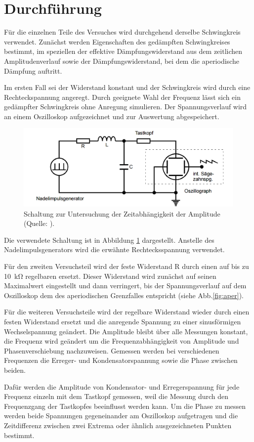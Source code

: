 \section{Durchführung}
\label{sec:Durchführung}
Für die einzelnen Teile des Versuches wird durchgehend derselbe Schwingkreis
verwendet. Zunächst werden Eigenschaften des gedämpften Schwingkreises bestimmt,
im speziellen der effektive
Dämpfungswiderstand aus dem zeitlichen Amplitudenverlauf
sowie der Dämpfungswiderstand, bei dem die aperiodische
Dämpfung auftritt.

Im ersten Fall sei der Widerstand konstant und der Schwingkreis wird durch eine
Rechteckspannung angeregt. Durch geeignete Wahl der Frequenz lässt sich ein
gedämpfter Schwingkreis ohne Anregung simulieren. Der Spannungsverlauf wird
an einem Oszilloskop aufgezeichnet und zur Auswertung abgespeichert.
\begin{figure}
  \centering
  \includegraphics[keepaspectratio, width=\textwidth]{5a.png}
  \caption{Schaltung zur Untersuchung der Zeitabhängigkeit
  der Amplitude (Quelle: \cite{officialmanual}).}
  \label{fig:5a}
\end{figure}
Die verwendete Schaltung ist in Abbildung \ref{fig:5a} dargestellt. Anstelle des
Nadelimpulsgenerators wird die erwähnte Rechtecksspannung verwendet.

Für den zweiten Versuchsteil wird der feste Widerstand R durch einen auf bis zu
\SI{10}{\kilo\ohm} regelbaren ersetzt. Dieser Widerstand wird zunächst auf seinen
Maximalwert eingestellt und dann verringert, bis der Spannungsverlauf
auf dem Oszilloskop dem des aperiodischen Grenzfalles entspricht
(siehe Abb.\ref{fig:aper}).

Für die weiteren Versuchsteile wird der regelbare Widerstand wieder durch einen
festen Widerstand ersetzt und die anregende Spannung zu einer sinusförmigen
Wechselspannung geändert. Die Amplitude bleibt über alle Messungen konstant,
die Frequenz wird geändert um die Frequenzabhängigkeit von Amplitude und
Phasenverschiebung nachzuweisen.
Gemessen werden bei verschiedenen Frequenzen die Erreger- und
Kondensatorspannung sowie die Phase zwischen beiden.

Dafür werden die Amplitude von Kondensator- und Erregerspannung für jede
Frequenz einzeln mit dem Tastkopf gemessen,
weil die Messung durch den Frequenzgang der Tastkopfes beeinflusst werden kann.
Um die Phase zu messen werden beide Spannungen gegeneinander am Oszilloskop
aufgetragen und die Zeitdifferenz zwischen zwei Extrema
oder ähnlich ausgezeichneten Punkten bestimmt.
